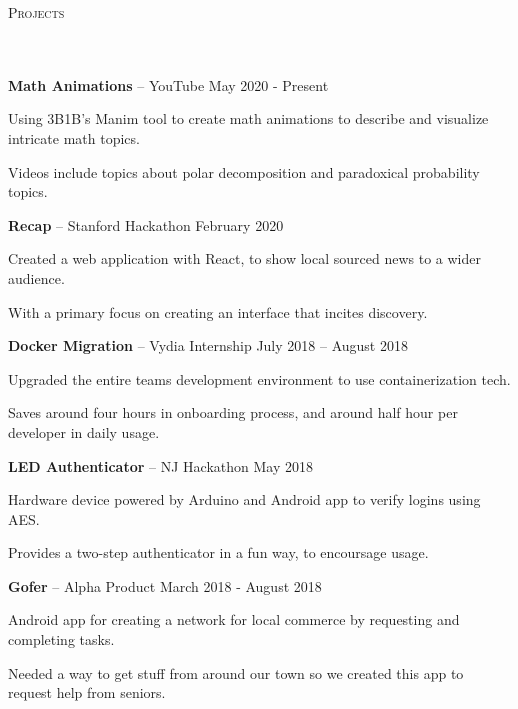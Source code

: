 \documentclass{article}
\newcommand{\header}[1]{{
\hspace*{-15pt}\vspace*{6pt} \textsc{#1}} \vspace*{-6pt} 
\lineunder
}
\newcommand{\lineunder}{
\vspace*{-8pt} \\ \hspace*{-18pt} 
\hrulefill \\
}
\newcommand{\project}[3]{{
\vspace*{2pt}%
\textbf{#1} #2 \hfill #3\vspace*{2pt}}
}
\renewcommand{\labelitemii}{
$\vcenter{\hbox{\tiny$\bullet$}}$\hspace*{-3pt}
}
\newenvironment{bullet-list-minor}{
\begin{list}{\labelitemii}{\setlength\leftmargin{15pt} 
\topsep 0pt \itemsep -2pt}}{\vspace*{4pt}\end{list}
}
\begin{document}
\vspace*{4pt}%
\header{Projects}

    \project{Math Animations}{ -- YouTube}{May 2020 - Present}
    \begin{bullet-list-minor}
    \item Using 3B1B's Manim tool to create math animations to describe and visualize intricate math topics.
    \item Videos include topics about polar decomposition and paradoxical probability topics. 
    \end{bullet-list-minor}

    \project{Recap}{ -- Stanford Hackathon}{February 2020}
    \begin{bullet-list-minor}
    \item Created a web application with React, to show local sourced news to a wider audience. 
    \item With a primary focus on creating an interface that incites discovery. 
    \end{bullet-list-minor}

    \project{Docker Migration}{ -- Vydia Internship}{ July 2018 -- August 2018}
	\begin{bullet-list-minor}
	\item Upgraded the entire teams development environment to use containerization tech. 
    \item Saves around four hours in onboarding process, and around half hour per developer in daily usage.
    \end{bullet-list-minor}

    \project{LED Authenticator}{ -- NJ Hackathon}{ May 2018}
	\begin{bullet-list-minor}
    \item Hardware device powered by Arduino and Android app to verify logins using AES. 
    \item Provides a two-step authenticator in a fun way, to encoursage usage. 
    \end{bullet-list-minor}

    \project{Gofer}{ -- Alpha Product}{ March 2018 - August 2018}
    \begin{bullet-list-minor}
    \item Android app for creating a network for local commerce by requesting and completing tasks.
    \item Needed a way to get stuff from around our town so we created this app to request help from seniors. 
    \end{bullet-list-minor}
\end{document}
